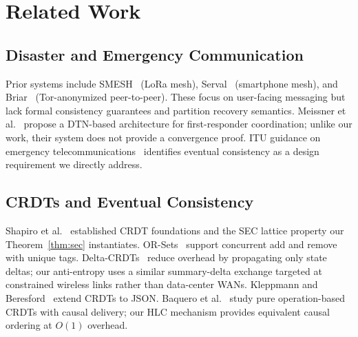 \documentclass[conference]{IEEEtran}
\begin{document}
\section{Related Work}
\label{sec:related}

\subsection{Disaster and Emergency Communication}
Prior systems include SMESH~\cite{foo_smesh_2010} (LoRa mesh),
Serval~\cite{gardner_serval_2013} (smartphone mesh), and
Briar~\cite{briar_2019} (Tor-anonymized peer-to-peer).  These focus on
user-facing messaging but lack formal consistency guarantees and partition
recovery semantics.  Meissner et al.~\cite{meissner_dtn_rescue_2012} propose
a DTN-based architecture for first-responder coordination; unlike our work,
their system does not provide a convergence proof.  ITU guidance on emergency
telecommunications~\cite{itu_disaster_2022} identifies eventual consistency
as a design requirement we directly address.

\subsection{CRDTs and Eventual Consistency}
Shapiro et al.~\cite{shapiro_crdt_2011,shapiro_crdt_tech_2011} established
CRDT foundations and the SEC lattice property our Theorem~\ref{thm:sec} instantiates.
OR-Sets~\cite{bieniusa_or_2012} support concurrent add and remove with unique tags.
Delta-CRDTs~\cite{almeida_delta_2018} reduce overhead by propagating only state
deltas; our anti-entropy uses a similar summary-delta exchange targeted at
constrained wireless links rather than data-center WANs.
Kleppmann and Beresford~\cite{kleppmann_byzantine_crdt_2017} extend CRDTs to JSON.
Baquero et al.~\cite{baquero_pure_op_2017} study pure operation-based CRDTs with
causal delivery; our HLC mechanism provides equivalent causal ordering at $O(1)$ overhead.
\end{document}
